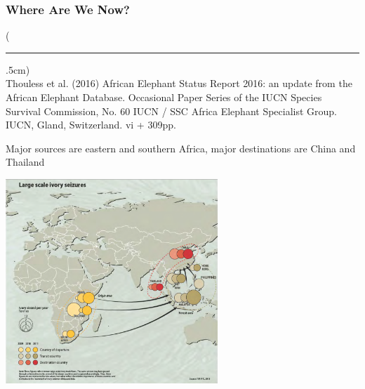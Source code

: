 \documentclass[10pt]{beamer}
\newenvironment{reference}[2]{%
	\begin{textblock*}{\textwidth}(#1,#2)
		\tiny\bgroup\color{gray}}{\egroup\end{textblock*}}
\begin{document}
\begin{frame}[t]
\frametitle{Where Are We Now?}
\vspace{0.25cm}

	\begin{reference}{4mm}{88mm}
		\rule{1.5cm}{0.25pt}\\
		Thouless et al. (2016) African Elephant Status Report 2016: an update from the African Elephant Database. Occasional Paper Series of the IUCN Species Survival Commission, No. 60 IUCN / SSC Africa Elephant Specialist Group. IUCN, Gland, Switzerland. vi + 309pp.
	\end{reference}
	
	Major sources are eastern and southern Africa, major destinations are China and Thailand  
	
	\vspace{0.25cm}
	
	\begin{center}
		\includegraphics[width=0.60\textwidth]{figures/import-export.png}
	\end{center}	
\end{frame}
\end{document}
